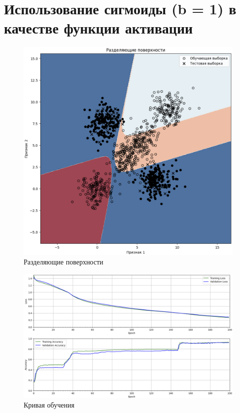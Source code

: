 \clearpage

\section{Использование сигмоиды (b = 1) в качестве функции активации}

\begin{figure}
	\begin{center}
		\includegraphics[width=\textwidth]{images/4.png}
	\end{center}
	\caption{Разделяющие поверхности}
	\label{img:4}
\end{figure}

\begin{figure}
	\begin{center}
		\includegraphics[width=\textwidth]{images/5.png}
	\end{center}
	\caption{Кривая обучения}
	\label{img:5}
\end{figure}

